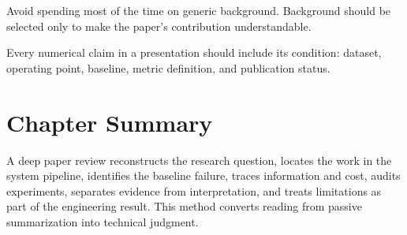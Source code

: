 Avoid spending most of the time on generic background. Background should be selected only to make the paper's contribution understandable.

\begin{engineeringcheck}
Every numerical claim in a presentation should include its condition: dataset, operating point, baseline, metric definition, and publication status.
\end{engineeringcheck}

\section{Chapter Summary}

A deep paper review reconstructs the research question, locates the work in the system pipeline, identifies the baseline failure, traces information and cost, audits experiments, separates evidence from interpretation, and treats limitations as part of the engineering result. This method converts reading from passive summarization into technical judgment.
